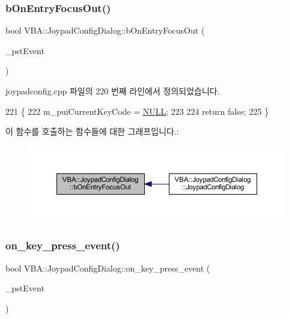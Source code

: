 \subsubsection{\texorpdfstring{b\+On\+Entry\+Focus\+Out()}{bOnEntryFocusOut()}}
{\footnotesize\ttfamily bool V\+B\+A\+::\+Joypad\+Config\+Dialog\+::b\+On\+Entry\+Focus\+Out (\begin{DoxyParamCaption}\item[{Gdk\+Event\+Focus $\ast$}]{\+\_\+pst\+Event }\end{DoxyParamCaption})\hspace{0.3cm}{\ttfamily [protected]}}



joypadconfig.\+cpp 파일의 220 번째 라인에서 정의되었습니다.


\begin{DoxyCode}
221 \{
222   m\_puiCurrentKeyCode = \mbox{\hyperlink{getopt1_8c_a070d2ce7b6bb7e5c05602aa8c308d0c4}{NULL}};
223 
224   \textcolor{keywordflow}{return} \textcolor{keyword}{false};
225 \}
\end{DoxyCode}
이 함수를 호출하는 함수들에 대한 그래프입니다.\+:
\nopagebreak
\begin{figure}[H]
\begin{center}
\leavevmode
\includegraphics[width=350pt]{class_v_b_a_1_1_joypad_config_dialog_a1e8f4908a9d7c4f027d4eeee8848a984_icgraph}
\end{center}
\end{figure}
\mbox{\label{class_v_b_a_1_1_joypad_config_dialog_afc9f3c90aa8e8f09811c470f97ef3993}} 
\subsubsection{\texorpdfstring{on\+\_\+key\+\_\+press\+\_\+event()}{on\_key\_press\_event()}}
{\footnotesize\ttfamily bool V\+B\+A\+::\+Joypad\+Config\+Dialog\+::on\+\_\+key\+\_\+press\+\_\+event (\begin{DoxyParamCaption}\item[{Gdk\+Event\+Key $\ast$}]{\+\_\+pst\+Event }\end{DoxyParamCaption})\hspace{0.3cm}{\ttfamily [protected]}}



